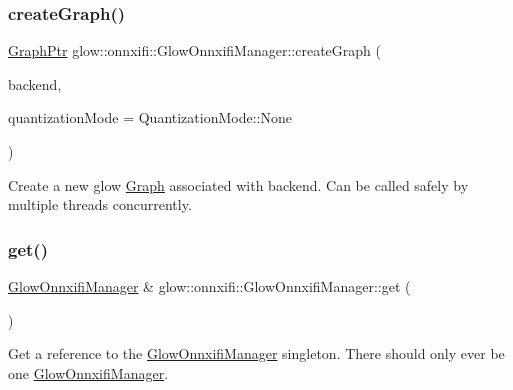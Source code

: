 \subsubsection{\texorpdfstring{create\+Graph()}{createGraph()}}
{\footnotesize\ttfamily \hyperlink{classglow_1_1onnxifi_1_1_graph}{Graph\+Ptr} glow\+::onnxifi\+::\+Glow\+Onnxifi\+Manager\+::create\+Graph (\begin{DoxyParamCaption}\item[{\hyperlink{classglow_1_1onnxifi_1_1_backend}{Backend\+Ptr}}]{backend,  }\item[{\hyperlink{structglow_1_1_precision_configuration_a9a40e5e2126e4c6f3e8fe3bab25ff12c}{Quantization\+Mode}}]{quantization\+Mode = {\ttfamily QuantizationMode\+:\+:None} }\end{DoxyParamCaption})}

Create a new glow \hyperlink{classglow_1_1onnxifi_1_1_graph}{Graph} associated with {\ttfamily backend}. Can be called safely by multiple threads concurrently. \mbox{\label{classglow_1_1onnxifi_1_1_glow_onnxifi_manager_a760b909b413290c2e910c73efde50e6c}} 
\subsubsection{\texorpdfstring{get()}{get()}}
{\footnotesize\ttfamily \hyperlink{classglow_1_1onnxifi_1_1_glow_onnxifi_manager}{Glow\+Onnxifi\+Manager} \& glow\+::onnxifi\+::\+Glow\+Onnxifi\+Manager\+::get (\begin{DoxyParamCaption}{ }\end{DoxyParamCaption})\hspace{0.3cm}{\ttfamily [static]}}

Get a reference to the \hyperlink{classglow_1_1onnxifi_1_1_glow_onnxifi_manager}{Glow\+Onnxifi\+Manager} singleton. There should only ever be one \hyperlink{classglow_1_1onnxifi_1_1_glow_onnxifi_manager}{Glow\+Onnxifi\+Manager}. \mbox{\label{classglow_1_1onnxifi_1_1_glow_onnxifi_manager_a516210ca277b60710c368ec6c88a8338}} 
